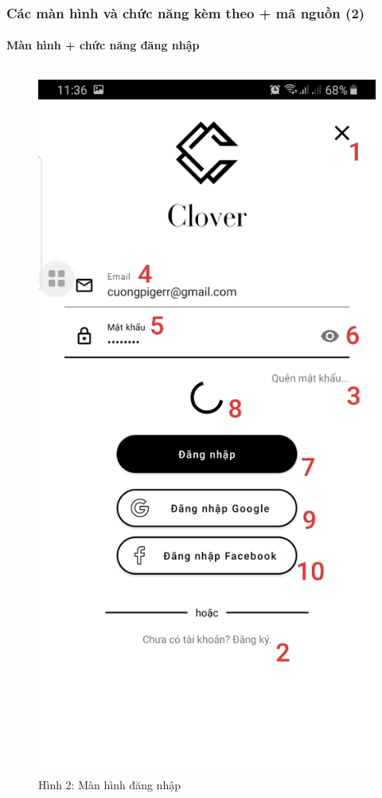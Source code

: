 \documentclass{beamer}
\begin{document}
\begin{frame}
    \frametitle{Các màn hình và chức năng kèm theo + mã nguồn (2)}
    \framesubtitle{Màn hình + chức năng đăng nhập}

    \begin{columns}
        \begin{figure}
            \centering
            \includegraphics[height=0.7\textheight]{images/02.png}
            \caption{\centering\tiny{Hình 2: Màn hình đăng nhập}}


\end{figure}
\end{columns}
\end{frame}
\end{document}
